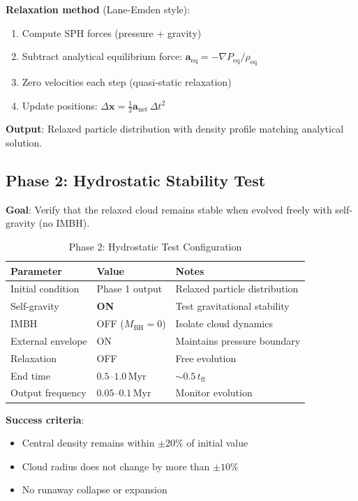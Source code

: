 \documentclass[11pt,a4paper]{article}
\begin{document}
\textbf{Relaxation method} (Lane-Emden style):
\begin{enumerate}
    \item Compute SPH forces (pressure + gravity)
    \item Subtract analytical equilibrium force: $\mathbf{a}_\mathrm{eq} = -\nabla P_\mathrm{eq}/\rho_\mathrm{eq}$
    \item Zero velocities each step (quasi-static relaxation)
    \item Update positions: $\Delta\mathbf{x} = \frac{1}{2}\mathbf{a}_\mathrm{net}\,\Delta t^2$
\end{enumerate}

\textbf{Output}: Relaxed particle distribution with density profile matching analytical solution.

\subsection{Phase 2: Hydrostatic Stability Test}

\textbf{Goal}: Verify that the relaxed cloud remains stable when evolved freely
with self-gravity (no IMBH).

\begin{table}[h]
\centering
\caption{Phase 2: Hydrostatic Test Configuration}
\begin{tabular}{lll}
\toprule
\textbf{Parameter} & \textbf{Value} & \textbf{Notes} \\
\midrule
Initial condition & Phase 1 output & Relaxed particle distribution \\
Self-gravity & \textbf{ON} & Test gravitational stability \\
IMBH & OFF ($M_\mathrm{BH} = 0$) & Isolate cloud dynamics \\
External envelope & ON & Maintains pressure boundary \\
Relaxation & OFF & Free evolution \\
\midrule
End time & $0.5$--$1.0\,\mathrm{Myr}$ & $\sim 0.5\,t_\mathrm{ff}$ \\
Output frequency & $0.05$--$0.1\,\mathrm{Myr}$ & Monitor evolution \\
\bottomrule
\end{tabular}
\end{table}

\textbf{Success criteria}:
\begin{itemize}
    \item Central density remains within $\pm 20\%$ of initial value
    \item Cloud radius does not change by more than $\pm 10\%$
    \item No runaway collapse or expansion
\end{itemize}
\end{document}
